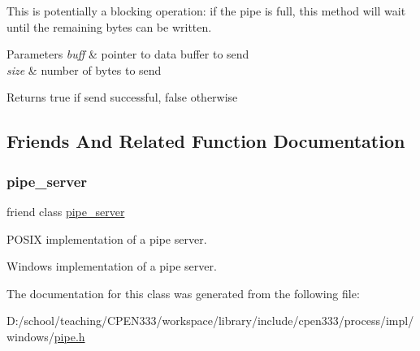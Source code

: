 This is potentially a blocking operation\+: if the pipe is full, this method will wait until the remaining bytes can be written.


\begin{DoxyParams}{Parameters}
{\em buff} & pointer to data buffer to send \\
\hline
{\em size} & number of bytes to send \\
\hline
\end{DoxyParams}
\begin{DoxyReturn}{Returns}
true if send successful, false otherwise 
\end{DoxyReturn}


\subsection{Friends And Related Function Documentation}
\mbox{\label{classcpen333_1_1process_1_1windows_1_1pipe_ab111e84ef31179e72c2bd2e58e2042b0}} 
\subsubsection{\texorpdfstring{pipe\+\_\+server}{pipe\_server}}
{\footnotesize\ttfamily friend class \hyperlink{classcpen333_1_1process_1_1windows_1_1pipe__server}{pipe\+\_\+server}\hspace{0.3cm}{\ttfamily [friend]}}



P\+O\+S\+IX implementation of a pipe server. 

Windows implementation of a pipe server. 

The documentation for this class was generated from the following file\+:\begin{DoxyCompactItemize}
\item 
D\+:/school/teaching/\+C\+P\+E\+N333/workspace/library/include/cpen333/process/impl/windows/\hyperlink{impl_2windows_2pipe_8h}{pipe.\+h}\end{DoxyCompactItemize}
